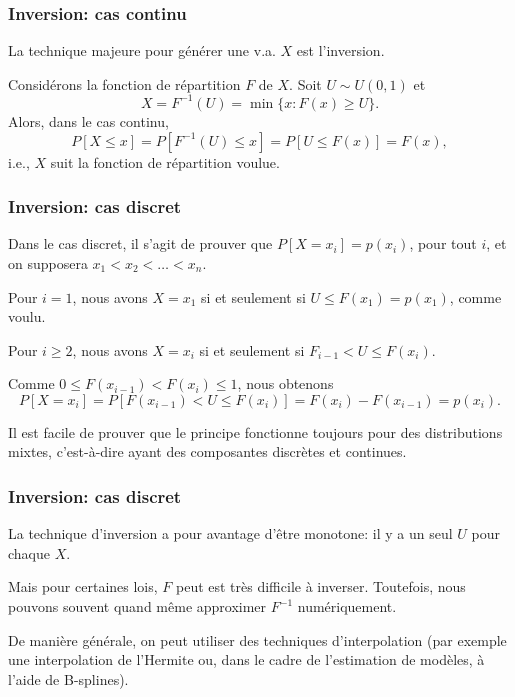 \documentclass[t,usepdftitle=false]{beamer}
\begin{document}
\begin{frame}
\frametitle{Inversion: cas continu}

La technique majeure pour générer une v.a. $X$ est l'inversion.

\mbox{}

Considérons la fonction de répartition $F$ de $X$.
Soit $U \sim U (0, 1)$ et
\[
X = F^{-1}(U) = \min \lbrace x : F (x)  \geq U \rbrace.
\]
Alors, dans le cas continu,
\[
P [X \leq x] = P [F^{-1}(U) \leq x] = P [U \leq F (x)] = F (x),
\]
i.e., $X$ suit la fonction de répartition voulue.
%
%

\end{frame}
	
\begin{frame}
\frametitle{Inversion: cas discret}

Dans le cas discret, il s'agit de prouver que $P[X = x_i] = p(x_i)$,
pour tout $i$, et on supposera $x_1 < x_2 < \ldots < x_n$.

\mbox{}

Pour $i = 1$, nous avons $X = x_1$ si et seulement si $U \leq F(x_1) =
p(x_1)$, comme voulu.

\mbox{}

Pour $i \geq 2$, nous avons $X = x_i$ si et seulement si $F_{i-1} < U
\leq F(x_i)$.

\mbox{}

Comme $0 \leq F(x_{i-1}) < F(x_i) \leq 1$, nous obtenons
\[
P[X = x_i] = P[F(x_{i-1}) < U \leq F(x_i)] = F(x_i) - F(x_{i-1}) = p(x_i).
\]

\mbox{}

Il est facile de prouver que le principe fonctionne toujours pour des
distributions mixtes, c'est-à-dire ayant des composantes discrètes et
continues.

\end{frame}

\begin{frame}
\frametitle{Inversion: cas discret}

La technique d'inversion a pour avantage d'être monotone: il y a un
seul $U$ pour chaque $X$.

\mbox{}

Mais pour certaines lois, $F$ peut est très difficile à inverser.
Toutefois, nous pouvons souvent quand même approximer $F^{-1}$
numériquement.

\mbox{}

De manière générale, on peut utiliser des techniques d'interpolation
(par exemple une interpolation de l'Hermite ou, dans le cadre de
l'estimation de modèles, à l'aide de B-splines).

\end{frame}
\end{document}
